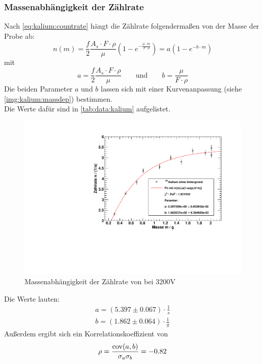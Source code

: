 \subsubsection{Massenabhängigkeit der Zählrate} %
Nach \autoref{eq:kalium:countrate} hängt die Zählrate folgendermaßen von der Masse der Probe ab:
\begin{equation}
  n(m) = \frac{f}{2} \frac{A_s \cdot F \cdot \rho}{\mu} \left( 1 - e^{- \frac{\mu \cdot m}{F \cdot \rho}} \right) = a(1-e^{-b \cdot m})
\end{equation}
mit
\begin{equation}
  a = \frac{f}{2} \frac{A_s \cdot F \cdot \rho}{\mu} \qquad \text{und} \qquad b = \frac{\mu}{F \cdot \rho}
\end{equation}
Die beiden Parameter $a$ und $b$ lassen sich mit einer Kurvenanpassung (siehe \autoref{img:kalium:massdep}) bestimmen. \\
Die Werte dafür sind in \autoref{tab:data:kalium} aufgelistet.
 
\begin{figure}[H]
\begin{center}
  \includegraphics[width=15cm]{../img/Kalium40_Massenabhaengigkeit.pdf}
  \caption[Massenabhängigkeit der Zählrate von \kalium]{Massenabhängigkeit der Zählrate von \kalium bei 3200V}
  \label{img:kalium:massdep}
\end{center}
\end{figure}
Die Werte lauten:
\begin{gather}
  a = (5.397 \pm 0.067) \cdot \frac{1}{s} \\ %
  b = (1.862 \pm 0.064) \cdot \frac{1}{g} 
\end{gather}
Außerdem ergibt sich ein Korrelationskoeffizient von
\begin{equation}
  \rho = \frac{\operatorname{cov}(a, b)}{\sigma_a \sigma_b} = -0.82
\end{equation}

